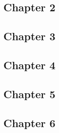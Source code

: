 \documentclass[10pt]{article}
\begin{document}
\subsection*{Chapter 2}



\subsection*{Chapter 3}



\subsection*{Chapter 4}


\subsection*{Chapter 5}



\subsection*{Chapter 6}
\end{document}
